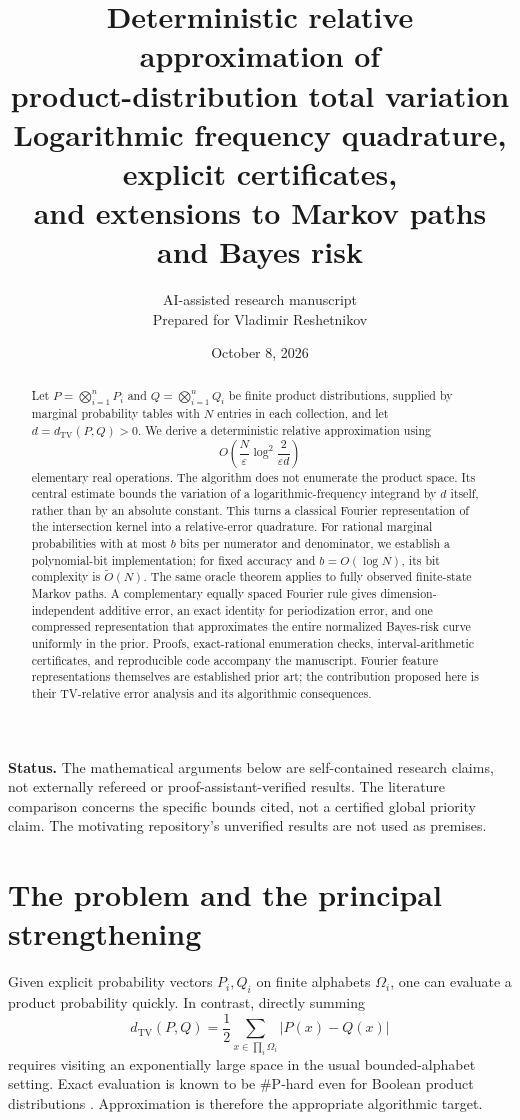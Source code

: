 \documentclass[11pt]{article}
\title{\vspace{-1.2em}Deterministic relative approximation of\\product-distribution total variation\\[0.5em]
\large Logarithmic frequency quadrature, explicit certificates,\\and extensions to Markov paths and Bayes risk}
\author{AI-assisted research manuscript\\\small Prepared for Vladimir Reshetnikov}
\date{October 8, 2026}
\theoremstyle{definition}
\theoremstyle{remark}
\DeclareMathOperator{\TV}{TV}
\newcommand{\eps}{\varepsilon}
\newcommand{\softO}{\widetilde O}
\begin{document}
\maketitle
\begin{abstract}
Let $P=\bigotimes_{i=1}^nP_i$ and $Q=\bigotimes_{i=1}^nQ_i$ be finite product distributions, supplied by marginal probability tables with $N$ entries in each collection, and let $d=d_{\TV}(P,Q)>0$. We derive a deterministic relative approximation using
\[
 O\!\left(\frac{N}{\eps}\log^2\frac{2}{\eps d}\right)
\]
elementary real operations. The algorithm does not enumerate the product space. Its central estimate bounds the variation of a logarithmic-frequency integrand by $d$ itself, rather than by an absolute constant. This turns a classical Fourier representation of the intersection kernel into a relative-error quadrature. For rational marginal probabilities with at most $b$ bits per numerator and denominator, we establish a polynomial-bit implementation; for fixed accuracy and $b=O(\log N)$, its bit complexity is $\softO(N)$. The same oracle theorem applies to fully observed finite-state Markov paths. A complementary equally spaced Fourier rule gives dimension-independent additive error, an exact identity for periodization error, and one compressed representation that approximates the entire normalized Bayes-risk curve uniformly in the prior. Proofs, exact-rational enumeration checks, interval-arithmetic certificates, and reproducible code accompany the manuscript. Fourier feature representations themselves are established prior art; the contribution proposed here is their TV-relative error analysis and its algorithmic consequences.
\end{abstract}

\noindent\textbf{Status.} The mathematical arguments below are self-contained research claims, not externally refereed or proof-assistant-verified results. The literature comparison concerns the specific bounds cited, not a certified global priority claim. The motivating repository's unverified results are not used as premises.

\newpage
\tableofcontents
\newpage

\section{The problem and the principal strengthening}
\label{sec:intro}

Given explicit probability vectors $P_i,Q_i$ on finite alphabets $\Omega_i$, one can evaluate a product probability quickly. In contrast, directly summing
\begin{equation}
 d_{\TV}(P,Q)=\frac12\sum_{x\in\prod_i\Omega_i}|P(x)-Q(x)|
 \label{eq:tv}
\end{equation}
requires visiting an exponentially large space in the usual bounded-alphabet setting. Exact evaluation is known to be \#P-hard even for Boolean product distributions \cite{BGM23}. Approximation is therefore the appropriate algorithmic target.
\end{document}
